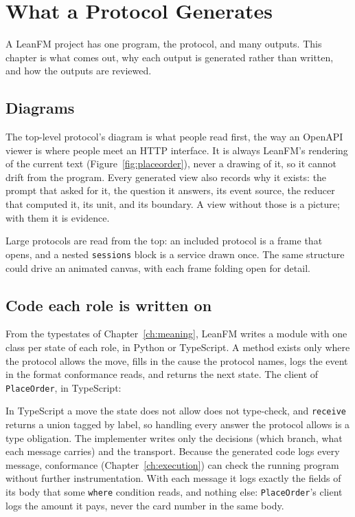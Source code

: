 \chapter{What a Protocol Generates}
\label{ch:generated}

A LeanFM project has one program, the protocol, and many outputs. This chapter is
what comes out, why each output is generated rather than written, and how the
outputs are reviewed.

\section{Diagrams}

The top-level protocol's diagram is what people read first, the way an OpenAPI
viewer is where people meet an HTTP interface. It is always LeanFM's rendering of
the current text (Figure~\ref{fig:placeorder}), never a drawing of it, so it
cannot drift from the program. Every generated view also records why it exists:
the prompt that asked for it, the question it answers, its event source, the
reducer that computed it, its unit, and its boundary. A view without those is a
picture; with them it is evidence.

Large protocols are read from the top: an included protocol is a frame that
opens, and a nested \texttt{sessions} block is a service drawn once. The same
structure could drive an animated canvas, with each frame folding open for
detail.

\section{Code each role is written on}

From the typestates of Chapter~\ref{ch:meaning}, LeanFM writes a module with one
class per state of each role, in Python or TypeScript. A method exists only where
the protocol allows the move, fills in the cause the protocol names, logs the
event in the format conformance reads, and returns the next state. The client of
\texttt{PlaceOrder}, in TypeScript:



In TypeScript a move the state does not allow does not type-check, and
\texttt{receive} returns a union tagged by label, so handling every answer the
protocol allows is a type obligation. The implementer writes only the decisions
(which branch, what each message carries) and the transport. Because the
generated code logs every message, conformance (Chapter~\ref{ch:execution}) can
check the running program without further instrumentation. With each message it
logs exactly the fields of its body that some \texttt{where} condition reads, and
nothing else: \texttt{PlaceOrder}'s client logs the amount it pays, never the card
number in the same body.

